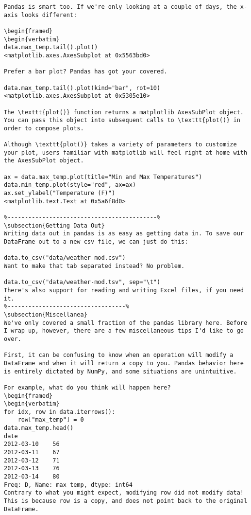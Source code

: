 \begin{framed}
\begin{verbatim}
Pandas is smart too. If we're only looking at a couple of days, the x-axis looks different:

\begin{framed}
\begin{verbatim}
data.max_temp.tail().plot()
<matplotlib.axes.AxesSubplot at 0x5563bd0>

Prefer a bar plot? Pandas has got your covered.

data.max_temp.tail().plot(kind="bar", rot=10)
<matplotlib.axes.AxesSubplot at 0x5305e10>

The \texttt{plot()} function returns a matplotlib AxesSubPlot object. You can pass this object into subsequent calls to \texttt{plot()} in order to compose plots.

Although \texttt{plot()} takes a variety of parameters to customize your plot, users familiar with matplotlib will feel right at home with the AxesSubPlot object.

ax = data.max_temp.plot(title="Min and Max Temperatures")
data.min_temp.plot(style="red", ax=ax)
ax.set_ylabel("Temperature (F)")
<matplotlib.text.Text at 0x5a6f8d0>

%-------------------------------------------%
\subsection{Getting Data Out}
Writing data out in pandas is as easy as getting data in. To save our DataFrame out to a new csv file, we can just do this:

data.to_csv("data/weather-mod.csv")
Want to make that tab separated instead? No problem.

data.to_csv("data/weather-mod.tsv", sep="\t")
There's also support for reading and writing Excel files, if you need it.
%----------------------------------%
\subsection{Miscellanea}
We've only covered a small fraction of the pandas library here. Before I wrap up, however, there are a few miscellaneous tips I'd like to go over.

First, it can be confusing to know when an operation will modify a DataFrame and when it will return a copy to you. Pandas behavior here is entirely dictated by NumPy, and some situations are unintuitive.

For example, what do you think will happen here?
\begin{framed}
\begin{verbatim}
for idx, row in data.iterrows():
    row["max_temp"] = 0
data.max_temp.head()
date
2012-03-10    56
2012-03-11    67
2012-03-12    71
2012-03-13    76
2012-03-14    80
Freq: D, Name: max_temp, dtype: int64
Contrary to what you might expect, modifying row did not modify data! This is because row is a copy, and does not point back to the original DataFrame.


\end{verbatim}
\end{framed}
